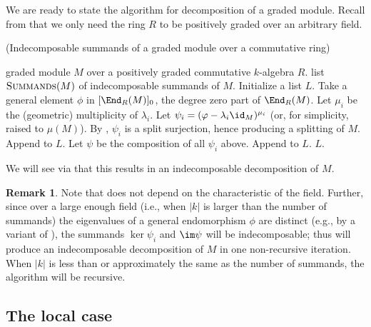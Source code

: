\documentclass[12pt]{article}
\theoremstyle{theorem}
\numberwithin{thm}{section}
\theoremstyle{definition}
\newtheorem{rem}[thm]{Remark}
\begin{document}
We are ready to state the algorithm for decomposition of a graded module. Recall from  that we only need the ring $R$ to be positively graded over an arbitrary field.

\begin{algorithm}[H]
  \caption{(Indecomposable summands of a graded module over a commutative ring)}\label{alg:graded}
  \begin{algorithmic}[1]
    \smallskip
    \Require graded module $M$ over a positively graded commutative $k$-algebra $R$.
    \Ensure  list $\textproc{Summands}(M)$ of indecomposable summands of $M$.
    \State Initialize a list $L$.
    \State Take a general element $\phi$ in $[\End_R(M)]_0$,
           the degree zero part of $\End_R(M)$. \label{item:End0}
      \State Let $\mu_i$ be the (geometric) multiplicity of $\lambda_i$.
      \State Let $\psi_i = (\phi - \lambda_i \id_M)^{\mu_i}$ (or, for simplicity, raised to $\mu(M)$).
      \State By , $\psi_i$ is a split surjection, hence producing a splitting of $M$.
      \State Append  to $L$.
    \EndFor
    \State Let $\psi$ be the composition of all $\psi_i$ above.
      \State Append  to $L$.
    \EndIf
    \State \Return $L$.
  \end{algorithmic}
\end{algorithm}

We will see via  that this results in an indecomposable decomposition of $M$.

\begin{rem}\label{rem:graded}
  Note that  does not depend on the characteristic of the field. Further, since over a large enough field (i.e., when $|k|$ is larger than the number of summands) the eigenvalues of a general endomorphism $\phi$ are distinct (e.g., by a variant of ), the summands $\ker\psi_i$ and $\im\psi$ will be indecomposable; thus  will produce an indecomposable decomposition of $M$ in one non-recursive iteration. When $|k|$ is less than or approximately the same as the number of summands, the algorithm will be recursive.
\end{rem}

\subsection{The local case}\label{sec:local-alg}
\end{document}

